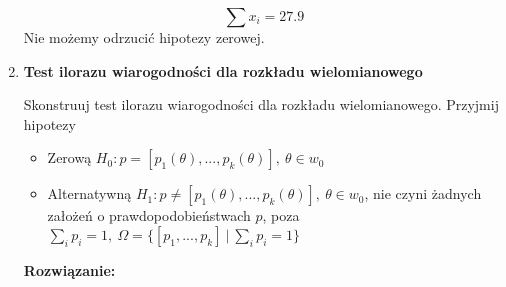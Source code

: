 \documentclass[11pt]{article}
\begin{document}
\begin{enumerate}
    \[\sum x_i = 27.9\]
    Nie możemy odrzucić hipotezy zerowej. 
    \item \textbf{Test ilorazu wiarogodności dla rozkładu wielomianowego} 
    \par 
    Skonstruuj test ilorazu wiarogodności dla rozkładu wielomianowego. Przyjmij hipotezy
    \begin{itemize}
        \item Zerową \(H_0:  p = [p_1(\theta), ..., p_k(\theta)], \: \theta \in w_0 \)
        \item Alternatywną \(H_1: p \neq [p_1(\theta), ..., p_k(\theta)], \: \theta \in w_0 \), nie czyni żadnych założeń o prawdopodobieństwach \(p\), poza \(\sum_i p_i = 1, \: \Omega = \{ [p_1, ..., p_k] \: | \: \sum_i p_i = 1\}\)
    \end{itemize}
    \par 
    \textbf{Rozwiązanie: }


\end{enumerate}
\end{document}
